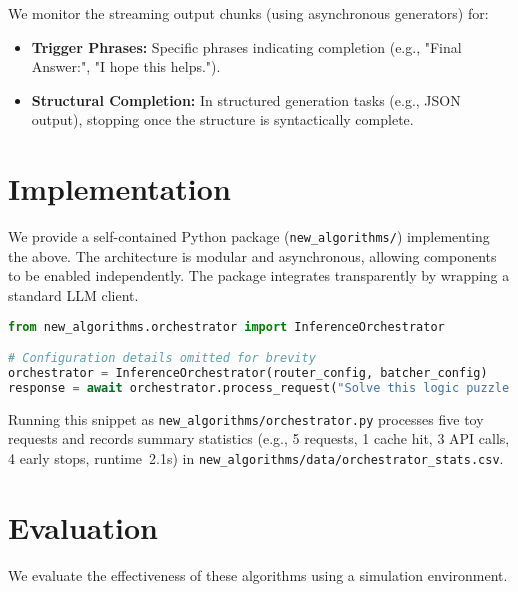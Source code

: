 \documentclass[11pt]{article}
\begin{document}
We monitor the streaming output chunks (using asynchronous generators) for:
\begin{itemize}
    \item \textbf{Trigger Phrases:} Specific phrases indicating completion (e.g., "Final Answer:", "I hope this helps.").
    \item \textbf{Structural Completion:} In structured generation tasks (e.g., JSON output), stopping once the structure is syntactically complete.
\end{itemize}

\section{Implementation}
We provide a self-contained Python package (\texttt{new\_algorithms/}) implementing the above. The architecture is modular and asynchronous, allowing components to be enabled independently. The package integrates transparently by wrapping a standard LLM client.

\begin{lstlisting}[language=Python, caption=Example usage of the integrated orchestrator]
from new_algorithms.orchestrator import InferenceOrchestrator

# Configuration details omitted for brevity
orchestrator = InferenceOrchestrator(router_config, batcher_config)
response = await orchestrator.process_request("Solve this logic puzzle...", params)
\end{lstlisting}

Running this snippet as \texttt{new\_algorithms/orchestrator.py} processes five toy requests and records summary statistics (e.g., 5 requests, 1 cache hit, 3 API calls, 4 early stops, runtime~\approx2.1s) in \texttt{new\_algorithms/data/orchestrator\_stats.csv}.

\section{Evaluation}
We evaluate the effectiveness of these algorithms using a simulation environment.
\end{document}
